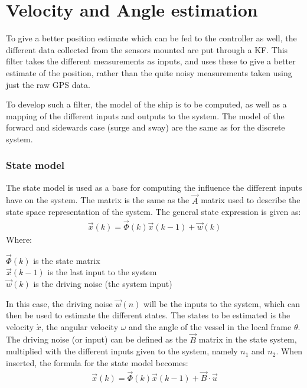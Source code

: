 \chapter{Velocity and Angle estimation}
To give a better position estimate which can be fed to the controller as well, the different data collected from the sensors mounted are put through a \ac{KF}. This filter takes the different measurements as inputs, and uses these to give a better estimate of the position, rather than the quite noisy measurements taken using just the raw \ac{GPS} data. 

To develop such a filter, the model of the ship is to be computed, as well as a mapping of the different inputs and outputs to the system. The model of the forward and sidewards case (surge and sway) are the same as for the discrete system. 

\subsection{State model}
The state model is used as a base for computing the influence the different inputs have on the system. The matrix is the same as the $\vec{A}$ matrix used to describe the state space representation of the system. The general state expression is given as:
\begin{align}
\vec{x}(k) = \vec{\Phi}(k)\vec{x}(k-1) + \vec{w}(k)
\end{align}
\noindent Where:
\begin{ffk}
$\vec{\Phi}(k)$ is the state matrix\\
$\vec{x}(k-1)$ is the last input to the system\\
$\vec{w}(k)$ is the driving noise (the system input)
\end{ffk}
In this case, the driving noise $\vec{w}(n)$ will be the inputs to the system, which can then be used to estimate the different states. The states to be estimated is the velocity $\dot{x}$, the angular velocity $\omega$ and the angle of the vessel in the local frame $\theta$. The driving noise (or input) can be defined as the $\vec{B}$ matrix in the state system, multiplied with the different inputs given to the system, namely $n_1$ and $n_2$. When inserted, the formula for the state model becomes:
\begin{align}
\vec{x}(k) = \vec{\Phi}(k)\vec{x}(k-1) + \vec{B}\cdot\vec{u}
\end{align}

